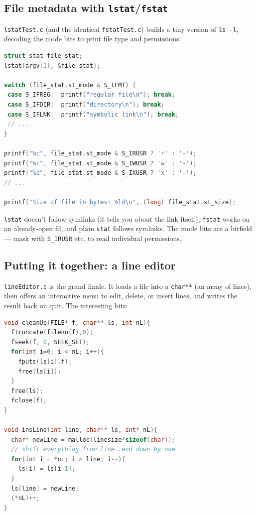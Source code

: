 \documentclass[11pt]{article}
\begin{document}
\subsection*{File metadata with \texttt{lstat}/\texttt{fstat}}

\texttt{lstatTest.c} (and the identical \texttt{fstatTest.c}) builds
a tiny version of \texttt{ls -l}, decoding the mode bits to print
file type and permissions:

\begin{lstlisting}[language=C]
struct stat file_stat;
lstat(argv[1], &file_stat);

switch (file_stat.st_mode & S_IFMT) {
 case S_IFREG:  printf("regular file\n"); break;
 case S_IFDIR:  printf("directory\n"); break;
 case S_IFLNK:  printf("symbolic link\n"); break;
 // ...
}

printf("%c", file_stat.st_mode & S_IRUSR ? 'r' : '-');
printf("%c", file_stat.st_mode & S_IWUSR ? 'w' : '-');
printf("%c", file_stat.st_mode & S_IXUSR ? 'x' : '-');
// ...

printf("Size of file in bytes: %ld\n", (long) file_stat.st_size);
\end{lstlisting}

\texttt{lstat} doesn't follow symlinks (it tells you about the link
itself), \texttt{fstat} works on an already-open fd, and plain
\texttt{stat} follows symlinks. The mode bits are a bitfield ---
mask with \texttt{S\_IRUSR} etc. to read individual permissions.

\subsection*{Putting it together: a line editor}

\texttt{lineEditor.c} is the grand finale. It loads a file into a
\texttt{char**} (an array of lines), then offers an interactive
menu to edit, delete, or insert lines, and writes the result back
on quit. The interesting bits:

\begin{lstlisting}[language=C]
void cleanUp(FILE* f, char** ls, int nL){
  ftruncate(fileno(f),0);
  fseek(f, 0, SEEK_SET);
  for(int i=0; i < nL; i++){
    fputs(ls[i],f);
    free(ls[i]);
  }
  free(ls);
  fclose(f);
}

void insLine(int line, char** ls, int* nL){
  char* newLine = malloc(linesize*sizeof(char));
  // shift everything from line..end down by one
  for(int i = *nL; i > line; i--){
    ls[i] = ls[i-1];
  }
  ls[line] = newLine;
  (*nL)++;
}
\end{lstlisting}
\end{document}
